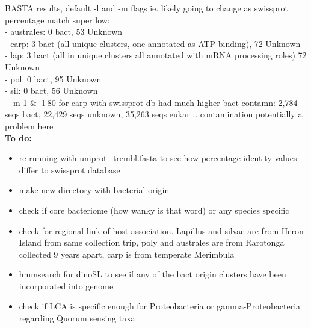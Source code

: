 \documentclass[12pt]{article}
\begin{document}
BASTA results, default -l and -m flags ie. likely going to change as swissprot percentage match super low:\\
- australes: 0 bact, 53 Unknown \\
- carp: 3 bact (all unique clusters, one annotated as ATP binding), 72 Unknown \\
- lap: 3 bact (all in unique clusters all annotated with mRNA processing roles) 72 Unknown \\
- pol: 0 bact, 95 Unknown \\
- sil: 0 bact, 56 Unknown \\
- -m 1 \& -l 80 for carp with swissprot db had much higher bact contamn: 2,784 seqs bact, 22,429 seqs unknown, 35,263 seqs eukar .. contamination potentially a problem here \\
\textbf{To do:}
\begin{itemize}
\item re-running with uniprot\_trembl.fasta to see how percentage identity values differ to swissprot database
\item make new directory with bacterial origin 
\item check if core bacteriome (how wanky is that word) or any species specific
\item check for regional link of host association. Lapillus and silvae are from Heron Island from same collection trip, poly and australes are from Rarotonga collected 9 years apart, carp is from temperate Merimbula
\item hmmsearch for dinoSL to see if any of the bact origin clusters have been incorporated into genome
\item check if LCA is specific enough for Proteobacteria or gamma-Proteobacteria regarding Quorum sensing taxa
\end{itemize}
\end{document}
